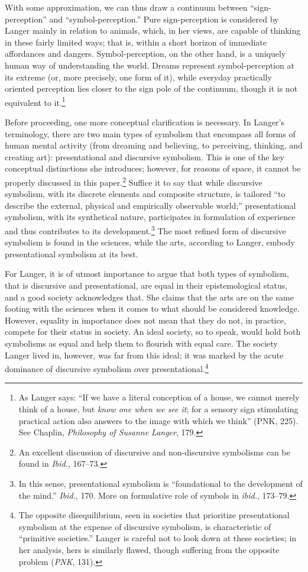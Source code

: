 \documentclass{tufte-handout}
\begin{document}
With some approximation, we can thus draw a continuum between
``sign-perception'' and ``symbol-perception.'' Pure sign-perception is
considered by Langer mainly in relation to animals, which, in her views,
are capable of thinking in these fairly limited ways; that is, within a
short horizon of immediate affordances and dangers. Symbol-perception,
on the other hand, is a uniquely human way of understanding the world.
Dreams represent symbol-perception at its extreme (or, more precisely,
one form of it), while everyday practically oriented perception lies
closer to the sign pole of the continuum, though it is not equivalent to
it.\footnote{As Langer says: ``If we have a literal conception of a
  house, we cannot merely think of a house, but \emph{know one when we
  see it}; for a sensory sign stimulating practical action also answers
  to the image with which we think'' (PNK, 225). See Chaplin,
  \emph{Philosophy of Susanne Langer}, 179.}

Before proceeding, one more conceptual clarification is necessary. In
Langer's terminology, there are two main types of symbolism that
encompass all forms of human mental activity (from dreaming and
believing, to perceiving, thinking, and creating art): presentational
and discursive symbolism. This is one of the key conceptual distinctions
she introduces; however, for reasons of space, it cannot be properly
discussed in this paper.\footnote{An excellent discussion of discursive
  and non-discursive symbolisms can be found in \emph{Ibid.}, 167--73.}
Suffice it to say that while discursive symbolism, with its discrete
elements and composite structure, is tailored ``to describe the
external, physical and empirically observable world;'' presentational
symbolism, with its synthetical nature, participates in formulation of
experience and thus contributes to its development.\footnote{In this
  sense, presentational symbolism is ``foundational to the development
  of the mind.'' \emph{Ibid.}, 170. More on formulative role of symbols
  in \emph{ibid.}, 173--79.} The most refined form of discursive
symbolism is found in the sciences, while the arts, according to Langer,
embody presentational symbolism at its best.

For Langer, it is of utmost importance to argue that both types of
symbolism, that is discursive and presentational, are equal in their
epistemological status, and a good society acknowledges that. She claims
that the arts are on the same footing with the sciences when it comes to
what should be considered knowledge. However, equality in importance
does not mean that they do not, in practice, compete for their status in
society. An ideal society, so to speak, would hold both symbolisms as
equal and help them to flourish with equal care. The society Langer
lived in, however, was far from this ideal; it was marked by the acute
dominance of discursive symbolism over presentational.\footnote{The
  opposite disequilibrium, seen in societies that prioritize
  presentational symbolism at the expense of discursive symbolism, is
  characteristic of ``primitive societies.'' Langer is careful not to
  look down at these societies; in her analysis, hers is similarly
  flawed, though suffering from the opposite problem (\emph{PNK}, 131).}
\end{document}
